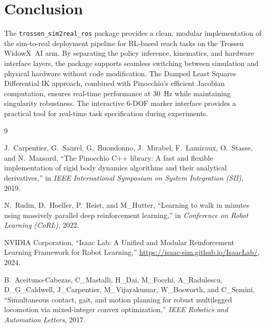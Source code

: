 \documentclass[12pt, a4paper]{article}
\begin{document}
\section{Conclusion}
\label{sec:conclusion}

The \texttt{trossen\_sim2real\_ros} package provides a clean, modular implementation
of the sim-to-real deployment pipeline for RL-based reach tasks on the Trossen
WidowX~AI arm. By separating the policy inference, kinematics, and hardware
interface layers, the package supports seamless switching between simulation and
physical hardware without code modification. The Damped Least Squares Differential
IK approach, combined with Pinocchio's efficient Jacobian computation, ensures
real-time performance at 30~Hz while maintaining singularity robustness. The
interactive 6-DOF marker interface provides a practical tool for real-time task
specification during experiments.

\begin{thebibliography}{9}

J.~Carpentier, G.~Saurel, G.~Buondonno, J.~Mirabel, F.~Lamiraux, O.~Stasse,
and N.~Mansard,
``The Pinocchio C++ library: A fast and flexible implementation of rigid body
dynamics algorithms and their analytical derivatives,''
in \textit{IEEE International Symposium on System Integration (SII)}, 2019.

N.~Rudin, D.~Hoeller, P.~Reist, and M\_Hutter,
``Learning to walk in minutes using massively parallel deep reinforcement learning,''
in \textit{Conference on Robot Learning (CoRL)}, 2022.

NVIDIA Corporation,
``Isaac Lab: A Unified and Modular Reinforcement Learning Framework for Robot
Learning,''
\url{https://isaac-sim.github.io/IsaacLab/}, 2024.

B.~Aceituno-Cabezas, C\_Mastalli, H\_Dai, M\_Focchi, A\_Radulescu, D\_G\_Caldwell,
J\_Carpentier, M\_Vijayakumar, W\_Bosworth, and C\_Semini,
``Simultaneous contact, gait, and motion planning for robust multilegged locomotion
via mixed-integer convex optimization,''
\textit{IEEE Robotics and Automation Letters}, 2017.

\end{thebibliography}
\end{document}

